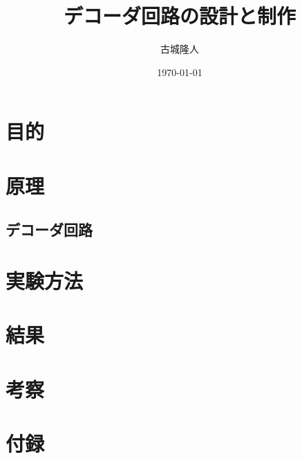 \documentclass[a4paper,11pt]{jsarticle}
\begin{document}
\title{デコーダ回路の設計と制作}
\author{古城隆人}
\date{\today}
\maketitle


\section{目的}

\section{原理}
\subsection{デコーダ回路}

\section{実験方法}

\section{結果}

\section{考察}

\section{付録}
\end{document}
